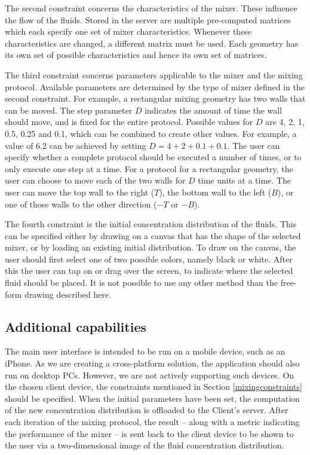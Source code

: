 The second constraint concerns the characteristics of the mixer. These influence the flow of the fluids. Stored in the server are multiple pre-computed matrices which each specify one set of mixer characteristics. Whenever these characteristics are changed, a different matrix must be used. Each geometry has its own set of possible characteristics and hence its own set of matrices.

The third constraint concerns parameters applicable to the mixer and the mixing protocol. Available parameters are determined by the type of mixer defined in the second constraint. For example, a rectangular mixing geometry has two walls that can be moved. The step parameter $D$ indicates the amount of time the wall should move, and is fixed for the entire protocol. Possible values for $D$ are 4, 2, 1, 0.5, 0.25 and 0.1, which can be combined to create other values. For example, a value of 6.2 can be achieved by setting $D=4+2+0.1+0.1$. The user can specify whether a complete protocol should be executed a number of times, or to only execute one step at a time. For a protocol for a rectangular geometry, the user can choose to move each of the two walls for $D$ time units at a time. The user can move the top wall to the right ($T$), the bottom wall to the left ($B$), or one of those walls to the other direction ($-T$ or $-B$).

The fourth constraint is the initial concentration distribution of the fluids. This can be specified either by drawing on a canvas that has the shape of the selected mixer, or by loading an existing initial distribution. To draw on the canvas, the user should first select one of two possible colors, namely black or white. After this the user can tap on or drag over the screen, to indicate where the selected fluid should be placed. It is not possible to use any other method than the free-form drawing described here.

\subsection{Additional capabilities}
The main user interface is intended to be run on a mobile device, such as an iPhone. As we are creating a cross-platform solution, the application should also run on desktop PCs. However, we are not actively supporting such devices. On the chosen client device, the constraints mentioned in Section \ref{mixingconstraints} should be specified. When the initial parameters have been set, the computation of the new concentration distribution is offloaded to the Client's server. After each iteration of the mixing protocol, the result -- along with a metric indicating the performance of the mixer -- is sent back to the client device to be shown to the user via a two-dimensional image of the fluid concentration distribution.

